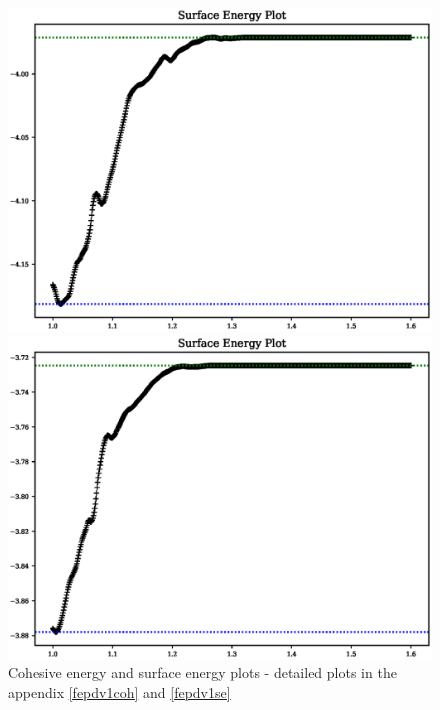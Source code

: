 \begin{figure}[ht]
  \centering
  \begin{minipage}[b]{0.4\linewidth}
    \centering
    \includegraphics[width=.98\linewidth]{chapters/potentials_fe_pd_ru/pot_fepd_fcc_1/fe_surface_energy.eps} 
  \end{minipage}%
  \begin{minipage}[b]{0.4\linewidth}
    \centering
    \includegraphics[width=.98\linewidth]{chapters/potentials_fe_pd_ru/pot_fepd_fcc_1/pd_surface_energy.eps} 
  \end{minipage}%
	\caption{Cohesive energy and surface energy plots - detailed plots in the appendix \ref{fepdv1coh} and \ref{fepdv1se}}  
\label{fig:v1plots}
\end{figure}
\FloatBarrier

